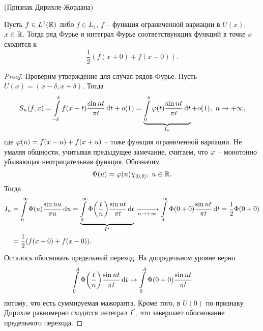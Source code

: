 \begin{theorem}(Признак Дирихле-Жордана)

    Пусть $f \in L^1(\mathbb{R})$ либо $f \in \widetilde{L}_1$, $f$ -- функция ограниченной
    вариации в $U(x)$, $x \in \mathbb{R}$. Тогда ряд Фурье и интеграл Фурье соответствующих
    функций в точке $x$ сходится к
    \[
        \frac{1}{2}(f(x + 0) + f(x - 0))
    .\]
\end{theorem}
\begin{proof}
    Проверим утверждение для случая рядов Фурье. Пусть $U(x) = (x - \delta, x + \delta)$.
    Тогда
    \[
        S_n(f, x) = \int\limits_{-\delta}^\delta{f(x - t) \frac{\sin{nt}}{\pi t} \,\mathrm{d}t}
        + o(1) = \underbrace{\int\limits_0^\delta{\varphi(t) \frac{\sin{nt}}{\pi t} \,\mathrm{d}t}}_{
        I_n} + o(1),~ n \to +\infty
    ,\]
    где $\varphi(u) = f(x - u) + f(x + u)$ -- тоже функция ограниченной вариации.
    Не умаляя общности, учитывая предыдущее замечание, считаем, что
    $\varphi$ -- монотонно убывающая неотрицательная функция. Обозначим
    \[
        \Phi(u) = \varphi(u) \chi_{[0, \delta]},~ u \in \mathbb{R}
    .\]
    Тогда
    \begin{align*}
        I_n 
        &= \intl_0^\infty{\Phi(u) \frac{\sin{nu}}{\pi u} \dd u} =
        \underbrace{\intl_0^\infty{\Phi\parens*{\frac{t}{n}} \frac{\sin{nt}}{\pi t} \dd t}}_
        {I^\ast}
        \xrightarrow[n \to +\infty]{} \intl_0^\infty{\Phi(0 + 0) \frac{\sin{nt}}
        {\pi t} \dd t} = \frac{1}{2} \Phi(0 + 0) \\
        &= \frac{1}{2}(f(x + 0) + f(x - 0))
    .\end{align*}
    Осталось обосновать предельный переход. На допредельном уровне верно
    \[
        \intl_0^A{\Phi\parens*{\frac{t}{n}} \frac{\sin{nt}}{\pi t} \dd t}
        \to \intl_0^A{\Phi(0 + 0) \frac{\sin{nt}}{\pi t}}
    \]
    потому, что есть суммируемая мажоранта. Кроме того, в $U(0)$ по признаку
    Дирихле равномерно сходится интеграл $I^\ast$, что завершает обоснование
    предельного перехода.
\end{proof}

